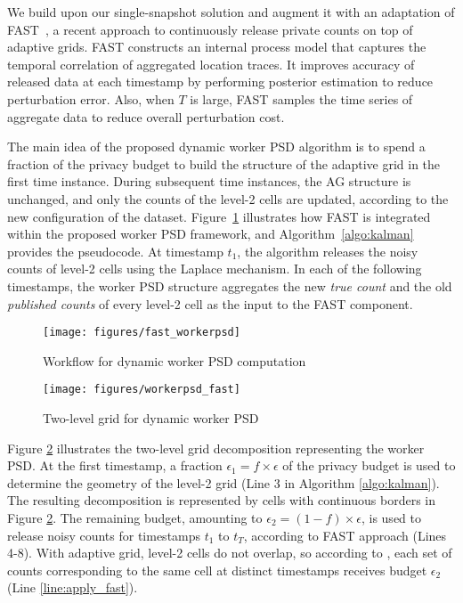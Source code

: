 \documentclass{USC-Thesis}
\numberwithin{equation}{chapter}
\begin{document}
We build upon our single-snapshot solution and augment it with an adaptation of FAST~\cite{Fan14TKDE}, a recent approach to continuously release private counts on top of adaptive grids. 
FAST constructs an internal process model that captures the temporal correlation of aggregated location traces. It improves accuracy of released data at each timestamp by performing posterior estimation to reduce perturbation error.  Also, when $T$ is large, FAST samples the time series of aggregate data to reduce overall perturbation cost.

The main idea of the proposed dynamic worker PSD algorithm is to spend a fraction of the privacy budget to build the structure of the adaptive grid in the first time instance. During subsequent time instances, the AG structure is unchanged, and only the counts of the level-2 cells are updated, according to the new configuration of the dataset.
Figure~\ref{fig:fast_workerpsd} illustrates how FAST is integrated within the proposed worker PSD framework, and Algorithm~\ref{algo:kalman} provides the pseudocode.
At timestamp $t_1$, the algorithm releases the noisy counts of level-2 cells using the Laplace mechanism. In each of the following timestamps, the worker PSD structure aggregates the new \emph{true count} and the old \emph{published counts} of every level-2 cell as the input to the FAST component.

\begin{figure}[!htb]\centering
  \texttt{[image: figures/fast\_workerpsd]}
  \caption{Workflow for dynamic worker PSD computation}
  \label{fig:fast_workerpsd}
\end{figure}


\begin{figure}[!htb]\centering
  \texttt{[image: figures/workerpsd\_fast]}
  \caption{Two-level grid for dynamic worker PSD}
  \label{fig:workerpsd_fast}
\end{figure}

Figure \ref{fig:workerpsd_fast} illustrates the two-level grid decomposition representing the worker PSD. At the first timestamp, a fraction $\epsilon_1 = f \times \epsilon$ of the privacy budget is used to determine the geometry of the level-2 grid (Line 3 in Algorithm \ref{algo:kalman}). The resulting decomposition is represented by cells with continuous borders in Figure \ref{fig:workerpsd_fast}. The remaining budget, amounting to $\epsilon_2 = (1-f)\times \epsilon$, is used to release noisy counts for timestamps $t_1$ to $t_T$, according to FAST approach (Lines 4-8). With adaptive grid, level-2 cells do not overlap, so according to \cite{cormode2012differentially}, each set of counts corresponding to the same cell at distinct timestamps receives budget $\epsilon_2$ (Line \ref{line:apply_fast}).
\end{document}
